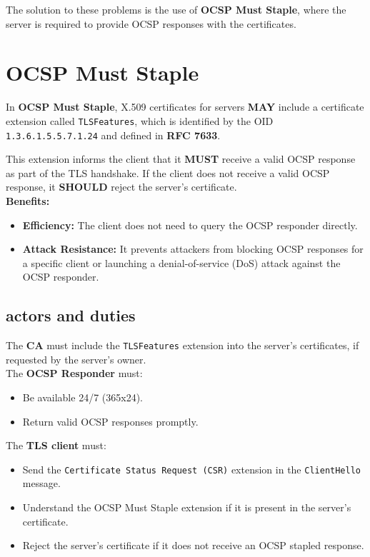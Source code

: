 The solution to these problems is the use of \textbf{OCSP Must Staple}, where the server is required to provide OCSP responses with the certificates.

\section{OCSP Must Staple}

In \textbf{OCSP Must Staple}, X.509 certificates for servers \textbf{MAY} include a certificate extension called \texttt{TLSFeatures}, which is identified by the OID \texttt{1.3.6.1.5.5.7.1.24} and defined in \textbf{RFC 7633}. 

This extension informs the client that it \textbf{MUST} receive a valid OCSP response as part of the TLS handshake. If the client does not receive a valid OCSP response, it \textbf{SHOULD} reject the server's certificate. \\

\textbf{Benefits:}
\begin{itemize}
    \item \textbf{Efficiency:} The client does not need to query the OCSP responder directly.
    \item \textbf{Attack Resistance:} It prevents attackers from blocking OCSP responses for a specific client or launching a denial-of-service (DoS) attack against the OCSP responder.
\end{itemize}

\subsection{actors and duties}

The \textbf{CA} must include the \texttt{TLSFeatures} extension into the server's certificates, if requested by the server's owner. \\

The \textbf{OCSP Responder} must:
\begin{itemize}
    \item Be available 24/7 (365x24).
    \item Return valid OCSP responses promptly.
\end{itemize}

The \textbf{TLS client} must:
\begin{itemize}
    \item Send the \texttt{Certificate Status Request (CSR)} extension in the \texttt{ClientHello} message.
    \item Understand the OCSP Must Staple extension if it is present in the server's certificate.
    \item Reject the server's certificate if it does not receive an OCSP stapled response.
\end{itemize}


